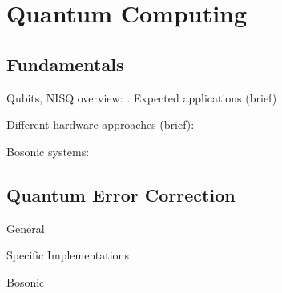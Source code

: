 
\chapter{Quantum Computing}
 
\section{Fundamentals}
Qubits, NISQ overview: \cite{Nielsen2010} \cite{Preskill2018} \cite{IBMintro} \cite{Kaye2007} \cite{Cleve2021}. Expected applications (brief)

Different hardware approaches (brief): \cite{Dwave} \cite{Zurich} \cite{IBMtec}

Bosonic systems: \cite{Zurich} \cite{Girvin2021}

\section{Quantum Error Correction}
General \cite{Girvin2021} \cite{Andersen2020} \cite{Gottesman2009} \cite{Roffe2019} \cite{devitt}

Specific Implementations \cite{Krinner2021} \cite{Chen2021} \cite{cleland2022}

Bosonic \cite{campagne2020} \cite{Lau2016} \cite{Chuang1997} \cite{Terhal2020} \cite{Blais2020} \cite{Hu2019} \cite{Michael2016} \cite{Grimsmo2021} \cite{Cai2021} \cite{Brady2023} \cite{lachance2023}